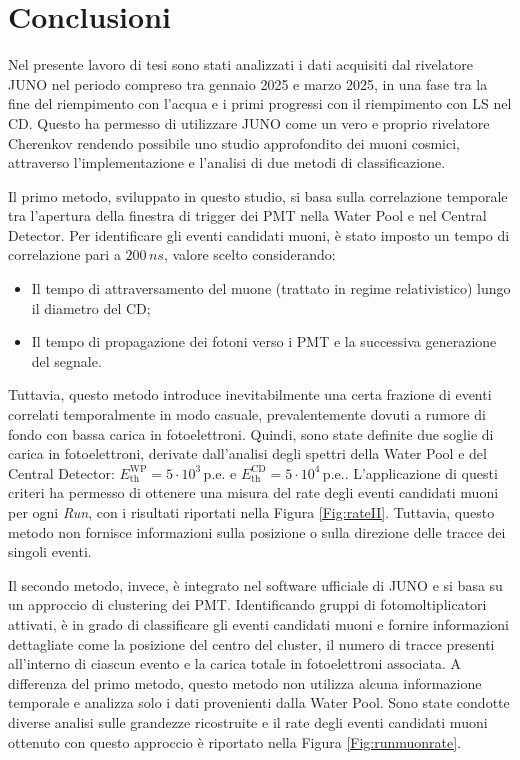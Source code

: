 \section{Conclusioni}
Nel presente lavoro di tesi sono stati analizzati i dati acquisiti dal rivelatore JUNO nel periodo compreso tra gennaio 2025 e marzo 2025, in una fase tra la fine del riempimento con l'acqua e i primi progressi con il riempimento con LS nel CD. Questo ha permesso di utilizzare JUNO come un vero e proprio rivelatore Cherenkov rendendo possibile uno studio approfondito dei muoni cosmici, attraverso l’implementazione e l’analisi di due metodi di classificazione.

Il primo metodo, sviluppato in questo studio, si basa sulla correlazione temporale tra l’apertura della finestra di trigger dei PMT nella Water Pool e nel Central Detector. Per identificare gli eventi candidati muoni, è stato imposto un tempo di correlazione pari a $200\,\unit{ns}$, valore scelto considerando:
\begin{itemize}
    \item Il tempo di attraversamento del muone (trattato in regime relativistico) lungo il diametro del CD;
    \item Il tempo di propagazione dei fotoni verso i PMT e la successiva generazione del segnale.
\end{itemize}
Tuttavia, questo metodo introduce inevitabilmente una certa frazione di eventi correlati temporalmente in modo casuale, prevalentemente dovuti a rumore di fondo con bassa carica in fotoelettroni. Quindi, sono state definite due soglie di carica in fotoelettroni, derivate dall’analisi degli spettri della Water Pool e del Central Detector: $E^\text{WP}_\text{th} = 5\cdot10^3\,\text{p.e.}$ e $E^\text{CD}_\text{th} = 5\cdot10^4\,\text{p.e.}$. L’applicazione di questi criteri ha permesso di ottenere una misura del rate degli eventi candidati muoni per ogni \textit{Run}, con i risultati riportati nella Figura \ref{Fig:rateII}. Tuttavia, questo metodo non fornisce informazioni sulla posizione o sulla direzione delle tracce dei singoli eventi.

Il secondo metodo, invece, è integrato nel software ufficiale di JUNO e si basa su un approccio di clustering dei PMT. Identificando gruppi di fotomoltiplicatori attivati, è in grado di classificare gli eventi candidati muoni e fornire informazioni dettagliate come la posizione del centro del cluster, il numero di tracce presenti all'interno di ciascun evento e la carica totale in fotoelettroni associata. A differenza del primo metodo, questo metodo non utilizza alcuna informazione temporale e analizza solo i dati provenienti dalla Water Pool. Sono state condotte diverse analisi sulle grandezze ricostruite e il rate degli eventi candidati muoni ottenuto con questo approccio è riportato nella Figura \ref{Fig:runmuonrate}.

